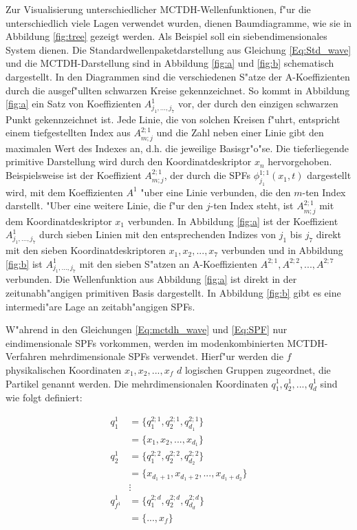 Zur Visualisierung unterschiedlicher MCTDH-Wellenfunktionen, f"ur die unterschiedlich viele Lagen verwendet wurden, dienen Baumdiagramme,
wie sie in Abbildung \ref{fig:tree} gezeigt werden.
Als Beispiel soll ein siebendimensionales System dienen.
Die Standardwellenpaketdarstellung aus Glei\-chung \ref{Eq:Std_wave} und die MCTDH-Darstellung sind in Abbildung \ref{fig:a} und \ref{fig:b} schematisch dargestellt.
In den Diagrammen sind die verschiedenen S"atze der A-Koeffizienten durch die ausgef"ullten schwarzen Kreise gekennzei\-chnet.
So kommt in Abbildung \ref{fig:a} ein Satz von Koeffizienten $A^{1}_{j_{1}, ..., j_{7}}$ vor, der durch den
einzigen schwarzen Punkt gekennzei\-chnet ist. 
Jede Linie, die von solchen Kreisen f"uhrt, entspricht einem tiefgestellten Index aus $ A^{2;1}_{m;j} $ und die Zahl neben einer Linie gibt den maximalen
Wert des Indexes an, d.h. die jeweilige Basisgr"o"se. Die tieferliegende primitive Darstellung wird durch den Koordinatdeskriptor $x_n$ hervorgehoben.
Beispielsweise ist der Koeffizient $A^{2;1}_{m;j}$, der durch die SPFs $ \phi^{1;1}_{j_1} (x_{1}, t) $ dargestellt wird, mit dem 
Koeffizienten $A^1$ "uber eine Linie verbunden, die den $m$-ten Index darstellt. "Uber eine weitere Linie, die f"ur den $j$-ten Index steht,
ist  $A^{2;1}_{m;j}$ mit dem Koordinatdeskriptor $x_1$ verbunden.
In Abbildung \ref{fig:a} ist der Koeffizient $A^{1}_{j_{1}, ..., j_{7}}$  durch sieben Linien mit den entsprechenden Indizes von 
$j_1$ bis $j_7$ direkt mit den sieben Koordinatdeskriptoren $x_1,x_2,...,x_7$ verbunden und in Abbildung \ref{fig:b} ist $A^{1}_{j_{1}, ..., j_{7}}$
mit den sieben S"atzen an A-Koeffizienten $A^{2;1},A^{2;2},...,A^{2;7}$ verbunden.
Die Wellenfunktion aus Abbildung \ref{fig:a} ist direkt 
in der zeitunabh"angigen primitiven Basis dargestellt. In Abbildung \ref{fig:b} gibt es eine intermedi"are Lage an zeitabh"angigen SPFs. 

W"ahrend in den Gleichungen \ref{Eq:mctdh_wave} und \ref{Eq:SPF} nur eindimensionale SPFs vorkommen, werden im modenkombinierten MCTDH-Verfahren
mehrdimensionale SPFs verwendet. 
Hier\-f"ur werden die $f$ physikalischen Koordinaten $x_{1}, x_{2}, ..., x_{f}$  $d$ logischen Gruppen zugeordnet, die Partikel genannt werden.
Die mehrdimensionalen Koordinaten $q^{1}_{1}, q^{1}_{2}, ..., q^{1}_{d}$ sind wie folgt definiert:


\begin{align*}
  q^{1}_{1} &= \{q^{2;1}_{1},q^{2;1}_{2},q^{2;1}_{d_{1}}\}\\ 
            &= \{x_{1}, x_{2}, ..., x_{d_1}\} \\
  q^{1}_{2} &= \{q^{2;2}_{1},q^{2;2}_{2},q^{2;2}_{d_{2}}\}\\ 
            &= \{x_{d_{1}+1}, x_{d_{1}+2}, ..., x_{d_{1}+d_{2}}\} \\
            &\vdots\\
  q^{1}_{f^1} &= \{q^{2;d}_{1},q^{2;d}_{2},q^{2;d}_{d_{d}}\} \\
            &= \{...,x_{f}\}
\end{align*}


